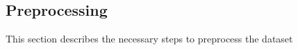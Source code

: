 \documentclass[../../sections/dataset.tex]{subfiles}
\begin{document}
\subsection{Preprocessing}

    This section describes the necessary steps to preprocess the dataset
\end{document}
